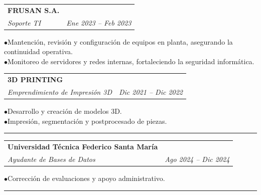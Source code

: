 \documentclass[11pt, a4paper]{article}
\begin{document}
\noindent\begin{tabularx}{\linewidth}{@{}X r@{}}
  \textbf{FRUSAN S.A.} & \\
  \textit{Soporte TI} & \textit{Ene 2023 -- Feb 2023} \\
\end{tabularx}
\hspace{1em}$\bullet$\enspace Mantención, revisión y configuración de equipos en planta, asegurando la continuidad operativa. \\
\hspace{1em}$\bullet$\enspace Monitoreo de servidores y redes internas, fortaleciendo la seguridad informática. \\
\vspace{4pt}

\noindent\begin{tabularx}{\linewidth}{@{}X r@{}}
  \textbf{3D PRINTING} & \\
  \textit{Emprendimiento de Impresión 3D} & \textit{Dic 2021 -- Dic 2022} \\
\end{tabularx}
\hspace{1em}$\bullet$\enspace Desarrollo y creación de modelos 3D. \\
\hspace{1em}$\bullet$\enspace Impresión, segmentación y postprocesado de piezas. \\
\vspace{4pt}


\vspace{6pt}\vspace{2pt}\hrule\vspace{4pt}

\noindent\begin{tabularx}{\linewidth}{@{}X r@{}}
  \textbf{Universidad Técnica Federico Santa María} & \\
  \textit{Ayudante de Bases de Datos} & \textit{Ago 2024 -- Dic 2024} \\
\end{tabularx}
\hspace{1em}$\bullet$\enspace Corrección de evaluaciones y apoyo administrativo. \\
\vspace{4pt}


\vspace{6pt}\vspace{2pt}\hrule\vspace{4pt}
\end{document}
